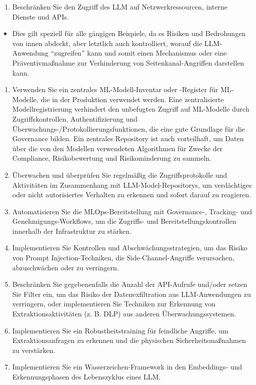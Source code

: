 \documentclass[
]{article}
\providecommand{\tightlist}{%
  \setlength{\itemsep}{0pt}\setlength{\parskip}{0pt}}
\begin{document}
\begin{enumerate}
\def\labelenumi{\arabic{enumi}.}
\setcounter{enumi}{1}
\tightlist
\item
  Beschränken Sie den Zugriff des LLM auf Netzwerkressourcen, interne
  Dienste und APIs.
\end{enumerate}

\begin{itemize}
\tightlist
\item
  Dies gilt speziell für alle gängigen Beispiele, da es Risiken und
  Bedrohungen von innen abdeckt, aber letztlich auch kontrolliert,
  worauf die LLM-Anwendung ``zugreifen'' kann und somit einen
  Mechanismus oder eine Präventivmaßnahme zur Verhinderung von
  Seitenkanal-Angriffen darstellen kann.
\end{itemize}

\begin{enumerate}
\def\labelenumi{\arabic{enumi}.}
\setcounter{enumi}{2}
\tightlist
\item
  Verwenden Sie ein zentrales ML-Modell-Inventar oder -Register für
  ML-Modelle, die in der Produktion verwendet werden. Eine
  zentralisierte Modellregistrierung verhindert den unbefugten Zugriff
  auf ML-Modelle durch Zugriffskontrollen, Authentifizierung und
  Überwachungs-/Protokollierungsfunktionen, die eine gute Grundlage für
  die Governance bilden. Ein zentrales Repository ist auch vorteilhaft,
  um Daten über die von den Modellen verwendeten Algorithmen für Zwecke
  der Compliance, Risikobewertung und Risikominderung zu sammeln.
\item
  Überwachen und überprüfen Sie regelmäßig die Zugriffsprotokolle und
  Aktivitäten im Zusammenhang mit LLM-Model-Repositorys, um verdächtiges
  oder nicht autorisiertes Verhalten zu erkennen und sofort darauf zu
  reagieren.
\item
  Automatisieren Sie die MLOps-Bereitstellung mit Governance-, Tracking-
  und Genehmigungs-Workflows, um die Zugriffs- und
  Bereitstellungskontrollen innerhalb der Infrastruktur zu stärken.
\item
  Implementieren Sie Kontrollen und Abschwächungsstrategien, um das
  Risiko von Prompt Injection-Techniken, die Side-Channel-Angriffe
  verursachen, abzuschwächen oder zu verringern.
\item
  Beschränken Sie gegebenenfalls die Anzahl der API-Aufrufe und/oder
  setzen Sie Filter ein, um das Risiko der Datenexfiltration aus
  LLM-Anwendungen zu verringern, oder implementieren Sie Techniken zur
  Erkennung von Extraktionsaktivitäten (z. B. DLP) aus anderen
  Überwachungssystemen.
\item
  Implementieren Sie ein Robustheitstraining für feindliche Angriffe, um
  Extraktionsanfragen zu erkennen und die physischen
  Sicherheitsmaßnahmen zu verstärken.
\item
  Implementieren Sie ein Wasserzeichen-Framework in den Embeddings- und
  Erkennungsphasen des Lebenszyklus eines LLM.
\end{enumerate}
\end{document}
